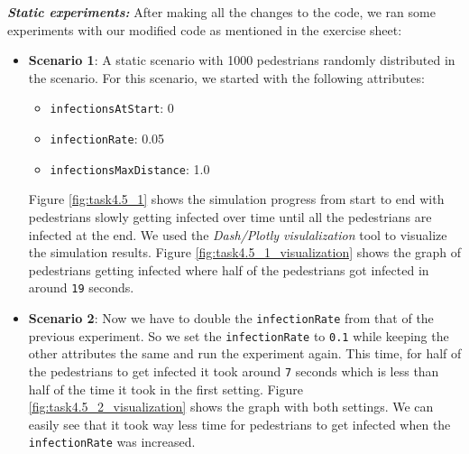 \textit{\textbf{Static experiments:}} After making all the changes to the code, we ran some experiments with our modified code as mentioned in the exercise sheet:
\begin{itemize}
    \item \textbf{Scenario 1}: A static scenario with 1000 pedestrians randomly distributed in the scenario. For this scenario, we started with the following attributes:
    \begin{itemize}
        \item \texttt{infectionsAtStart}: 0
        \item \texttt{infectionRate}: 0.05
        \item \texttt{infectionsMaxDistance}: 1.0
    \end{itemize}
    Figure \ref{fig:task4.5_1} shows the simulation progress from start to end with pedestrians slowly getting infected over time until all the pedestrians are infected at the end. We used the \textit{Dash/Plotly visulalization} tool to visualize the simulation results. Figure \ref{fig:task4.5_1_visualization} shows the graph of pedestrians getting infected where half of the pedestrians got infected in around \texttt{19} seconds.
    \item \textbf{Scenario 2}: Now we have to double the \texttt{infectionRate} from that of the previous experiment. So we set the \texttt{infectionRate} to \texttt{0.1} while keeping the other attributes the same and run the experiment again. 
    This time, for half of the pedestrians to get infected it took around \texttt{7} seconds which is less than half of the time it took in the first setting.
    Figure \ref{fig:task4.5_2_visualization} shows the graph with both settings. We can easily see that it took way less time for pedestrians to get infected when the \texttt{infectionRate} was increased.
\end{itemize}

